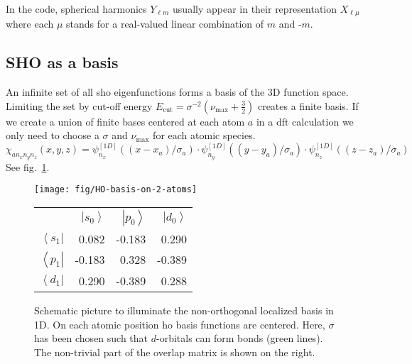 \documentclass[oribibl]{llncs}
\newcommand{\um}[1]{_{\mathrm{#1}}}
\newcommand{\ket}[1]{\left| #1 \right\rangle}
\newcommand{\bra}[1]{\left\langle #1 \right|}
\begin{document}
In the code, spherical harmonics $Y_{\ell m}$ usually appear in their representation
$X_{\ell \mu}$ where each $\mu$ stands for a real-valued linear combination of $m$ and -$m$.

\subsection{SHO as a basis}
An infinite set of all \ac{sho} eigenfunctions forms a basis of the 3D function space.
Limiting the set by cut-off energy $E\um{cut} = \sigma^{-2} (\nu\um{max} + \frac 32)$
creates a finite basis.
If we create a union of finite bases centered at each atom $a$ in a \ac{dft} calculation 
we only need to choose a $\sigma$ and $\nu\um{max}$ for each atomic species.
\begin{equation}
  \chi_{a n_x n_y n_z}(x,y,z) = \psi^{[1D]}_{n_x}((x - x_a)/\sigma_a) 
                          \cdot \psi^{[1D]}_{n_y}((y - y_a)/\sigma_a) 
                          \cdot \psi^{[1D]}_{n_z}((z - z_a)/\sigma_a)
  \label{eqn:localized-basis}
\end{equation}
See fig.~\ref{fig:HO-basis-on-2-atoms}.
%
\begin{figure}
  \begin{minipage}[c]{.58\textwidth}
	\texttt{[image: fig/HO-basis-on-2-atoms]} %
  \end{minipage}\hfill
  \begin{minipage}[c]{.41\textwidth}
  

		\begin{tabular}{r rrr}
		\toprule
				    & $\ket{s_0}$ & $\ket{p_0}$ & $\ket{d_0}$ \\
				$\bra{s_1}$  &      0.082 &  -0.183 &  0.290  \\
				$\bra{p_1}$  &     -0.183 &   0.328 & -0.389  \\
				$\bra{d_1}$  &      0.290 &  -0.389 &  0.288  \\
		\bottomrule
		\end{tabular}

  \end{minipage}
  \label{fig:HO-basis-on-2-atoms}
  \caption{
Schematic picture to illuminate the non-orthogonal localized basis in 1D.
On each atomic position \ac{ho} basis functions are centered.
Here, $\sigma$ has been chosen such that $d$-orbitals can form bonds (green lines).
The non-trivial part of the overlap matrix is shown on the right.
  }
\end{figure}
%
%
\end{document}
